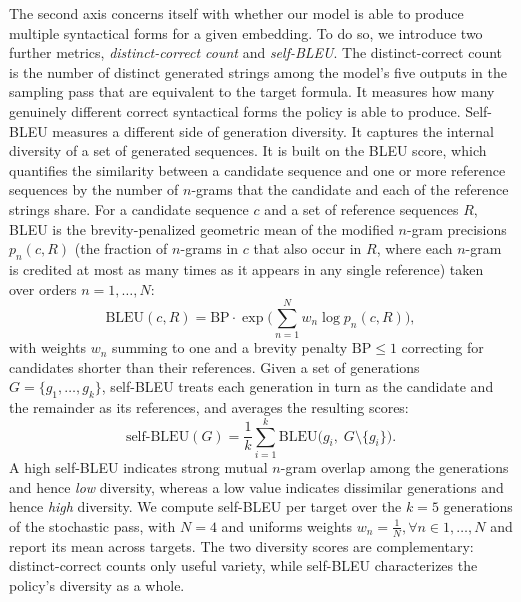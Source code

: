 \documentclass[titlepage,a4paper,11pt]{report}
\begin{document}
    
    The second axis concerns itself with whether our model is able to produce multiple syntactical forms for a given embedding. To do so, we introduce two further metrics, \textit{distinct-correct count} and \textit{self-BLEU}. The distinct-correct count is the number of distinct generated strings among the model's five outputs in the sampling pass that are equivalent to the target formula. It measures how many genuinely different correct syntactical forms the policy is able to produce. Self-BLEU \citep{zhu_texygen_2018} measures a different side of generation diversity. It captures the internal diversity of a set of generated sequences. It is built on the BLEU score, which quantifies the similarity between a candidate sequence and one or more reference sequences by the number of $n$-grams that the candidate and each of the reference strings share. For a candidate sequence $c$ and a set of reference sequences $R$, BLEU is the brevity-penalized geometric mean of the modified $n$-gram precisions $p_n(c, R)$ (the fraction of $n$-grams in $c$ that also occur in $R$, where each $n$-gram is credited at most as many times as it appears in any single reference) taken over orders $n = 1, \dots, N$:
    \begin{equation}
        \text{BLEU}(c, R) = \mathrm{BP}\cdot\exp\!\Big(\textstyle\sum_{n=1}^{N} w_n \log p_n(c, R)\Big),
    \end{equation}
    with weights $w_n$ summing to one and a brevity penalty $\mathrm{BP} \le 1$ correcting for candidates shorter than their references. Given a set of generations $G = \{g_1, \dots, g_k\}$, self-BLEU treats each generation in turn as the candidate and the remainder as its references, and averages the resulting scores:
    \begin{equation}
        \text{self-BLEU}(G) = \frac{1}{k}\sum_{i=1}^{k} \text{BLEU}\big(g_i,\; G \setminus \{g_i\}\big).
    \end{equation}
    A high self-BLEU indicates strong mutual $n$-gram overlap among the generations and hence \emph{low} diversity, whereas a low value indicates dissimilar generations and hence \emph{high} diversity. We compute self-BLEU per target over the $k = 5$ generations of the stochastic pass, with $N=4$ and uniforms weights $w_n = \frac{1}{N}, \forall n \in 1,\dots,N$ and report its mean across targets. The two diversity scores are complementary: distinct-correct counts only useful variety, while self-BLEU characterizes the policy's diversity as a whole.
\end{document}
